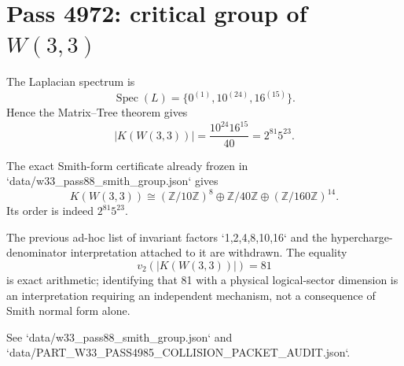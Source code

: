 
\section*{Pass 4972: critical group of $W(3,3)$}
The Laplacian spectrum is
\[
\operatorname{Spec}(L)=\{0^{(1)},10^{(24)},16^{(15)}\}.
\]
Hence the Matrix--Tree theorem gives
\[
|K(W(3,3))|=\frac{10^{24}16^{15}}{40}=2^{81}5^{23}.
\]

The exact Smith-form certificate already frozen in `data/w33_pass88_smith_group.json` gives
\[
K(W(3,3))\cong (\mathbb Z/10\mathbb Z)^8\oplus \mathbb Z/40\mathbb Z\oplus(\mathbb Z/160\mathbb Z)^{14}.
\]
Its order is indeed $2^{81}5^{23}$.

The previous ad-hoc list of invariant factors `1,2,4,8,10,16` and the hypercharge-denominator interpretation attached to it are withdrawn. The equality
\[
v_2(|K(W(3,3))|)=81
\]
is exact arithmetic; identifying that 81 with a physical logical-sector dimension is an interpretation requiring an independent mechanism, not a consequence of Smith normal form alone.

See `data/w33_pass88_smith_group.json` and `data/PART_W33_PASS4985_COLLISION_PACKET_AUDIT.json`.
